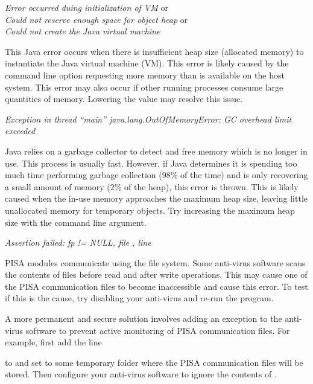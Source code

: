 \noindent
\textit{Error occurred duing initialization of VM} or\\
\textit{Could not reserve enough space for object heap} or\\
\textit{Could not create the Java virtual machine}
\begin{indented}
  This Java error occurs when there is insufficient heap size (allocated memory) to instantiate the Java virtual machine (VM).  This error is likely caused by the  command line option requesting more memory than is available on the host system.  This error may also occur if other running processes consume large quantities of memory.  Lowering the  value may resolve this issue.
\end{indented}

\noindent
\textit{Exception in thread ``main'' java.lang.OutOfMemoryError: GC overhead limit exceeded}
\begin{indented}
  Java relies on a garbage collector to detect and free memory which is no longer in use.  This process is usually fast.  However, if Java determines it is spending too much time performing garbage collection (98\% of the time) and is only recovering a small amount of memory (2\% of the heap), this error is thrown.  This is likely caused when the in-use memory approaches the maximum heap size, leaving little unallocated memory for temporary objects.  Try  increasing the maximum heap size with the  command line argument.
\end{indented}

\noindent
\textit{Assertion failed: fp != NULL, file , line }
\begin{indented}
  PISA modules communicate using the file system.  Some anti-virus software scans the contents of files before read and after write operations.  This may cause one of the PISA communication files to become inaccessible and cause this error.  To test if this is the cause, try disabling your anti-virus and re-run the program.
  
  A more permanent and secure solution involves adding an exception to the anti-virus software to prevent active monitoring of PISA communication files. For example, first add the line
  \begin{indented}
  \end{indented}
  to  and set  to some temporary folder where the PISA communication files will be stored.  Then configure your anti-virus software to ignore the contents of .
\end{indented}

